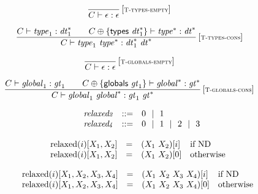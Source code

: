\vspace{1ex}

$$
\begin{array}{@{}c@{}}\displaystyle
\frac{
}{
C \vdash \epsilon : \epsilon
} \, {[\textsc{\scriptsize T{-}types{-}empty}]}
\qquad
\end{array}
$$

$$
\begin{array}{@{}c@{}}\displaystyle
\frac{
C \vdash {\mathit{type}}_1 : {{\mathit{dt}}_1^\ast}
 \qquad
C \oplus \{ \mathsf{types}~{{\mathit{dt}}_1^\ast} \} \vdash {{\mathit{type}}^\ast} : {{\mathit{dt}}^\ast}
}{
C \vdash {\mathit{type}}_1~{{\mathit{type}}^\ast} : {{\mathit{dt}}_1^\ast}~{{\mathit{dt}}^\ast}
} \, {[\textsc{\scriptsize T{-}types{-}cons}]}
\qquad
\end{array}
$$

$$
\begin{array}{@{}c@{}}\displaystyle
\frac{
}{
C \vdash \epsilon : \epsilon
} \, {[\textsc{\scriptsize T{-}globals{-}empty}]}
\qquad
\end{array}
$$

$$
\begin{array}{@{}c@{}}\displaystyle
\frac{
C \vdash {\mathit{global}}_1 : {\mathit{gt}}_1
 \qquad
C \oplus \{ \mathsf{globals}~{\mathit{gt}}_1 \} \vdash {{\mathit{global}}^\ast} : {{\mathit{gt}}^\ast}
}{
C \vdash {\mathit{global}}_1~{{\mathit{global}}^\ast} : {\mathit{gt}}_1~{{\mathit{gt}}^\ast}
} \, {[\textsc{\scriptsize T{-}globals{-}cons}]}
\qquad
\end{array}
$$

$$
\begin{array}[t]{@{}lrrl@{}l@{}}
& {\mathit{relaxed{\kern-0.1em\scriptstyle 2}}} & ::= & 0 ~~|~~ 1 \\
& {\mathit{relaxed{\kern-0.1em\scriptstyle 4}}} & ::= & 0 ~~|~~ 1 ~~|~~ 2 ~~|~~ 3 \\
\end{array}
$$

$$
\begin{array}[t]{@{}lcl@{}l@{}}
{{\mathrm{relaxed}}(i)}{{}[ X_1, X_2 ]} & = & (X_1~X_2){}[i] & \quad \mbox{if}~ {\mathrm{ND}} \\
{{\mathrm{relaxed}}(i)}{{}[ X_1, X_2 ]} & = & (X_1~X_2){}[0] & \quad \mbox{otherwise} \\
\end{array}
$$

$$
\begin{array}[t]{@{}lcl@{}l@{}}
{{\mathrm{relaxed}}(i)}{{}[ X_1, X_2, X_3, X_4 ]} & = & (X_1~X_2~X_3~X_4){}[i] & \quad \mbox{if}~ {\mathrm{ND}} \\
{{\mathrm{relaxed}}(i)}{{}[ X_1, X_2, X_3, X_4 ]} & = & (X_1~X_2~X_3~X_4){}[0] & \quad \mbox{otherwise} \\
\end{array}
$$

